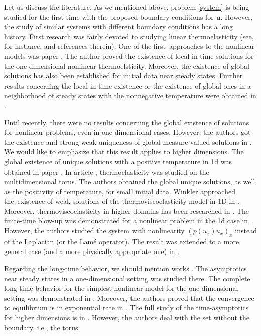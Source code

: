 \documentclass[11pt]{article}
\numberwithin{equation}{section}
\theoremstyle{plain}
\newcommand\bb[1]{\mathbf{#1}}
\newcommand{\bu}{\bb{u}}
\begin{document}
Let us discuss the literature. As we mentioned above, problem \eqref{system} is being studied for the first time with the proposed boundary conditions for $\bu$. However, the study of similar systems with different boundary conditions has a long history. First research was fairly devoted to studying linear thermoelasticity (see, for instance, \cite{lin1, lin2, Rackebook} and references therein). One of the first~approaches to the nonlinear models was paper \cite{Slem}. The author proved the existence of local-in-time solutions for the one-dimensional nonlinear thermoelsticity. Moreover, the existence of global solutions has also been established for initial data near steady states. Further results concerning the local-in-time existence or the existence of global ones in a neighborhood of steady states with the nonnegative temperature were obtained in  \cite{Racke1, Racke2, Racke3, Hrusa2}. 

Until recently, there were no results concerning the global existence of solutions for nonlinear problems, even in one-dimensional cases. However, the authors got the existence and strong-weak uniqueness of global measure-valued solutions in \cite{CMT}. We would like to emphasize that this result applies to higher dimensions. The global existence of unique solutions with a positive temperature in 1d was obtained in paper \cite{BC}. In article \cite{Biest}, thermoelasticity was studied on the multidimensional torus. The authors obtained the global unique solutions, as well as the positivity of temperature, for small initial data. Winkler approached the~existence of weak solutions of the thermoviscoelasticity model in 1D in \cite{Winkler2, Winkler1}. Moreover, thermoviscoelasticity in higher domains has been researched in \cite{Owczarek1, Owczarek}.  The finite-time blow-up was demonstrated for a nonlinear problem in the 1d case in \cite{DafHsi}. However, the authors studied the system with nonlinearity $(p(u_x)u_x)_x$ instead of the Laplacian (or the Lam\'e operator). The result was extended to a more general case (and a more physically appropriate one) in \cite{Hrusa1}. 

Regarding the long-time behavior, we should mention works \cite{Slem, Rackebook, TC2}. The asymptotics near steady states in a one-dimensional setting was studied there. The complete long-time behavior for the simplest nonlinear model for the one-dimensional setting was demonstrated in \cite{BC2}. Moreover, the authors proved that the convergence to equilibrium is in exponential rate in \cite{thermorate}. The full study of the time-asymptotics for higher dimensions is in \cite{Biest}. However, the authors deal with the set without the boundary, i.e., the torus.
\end{document}
